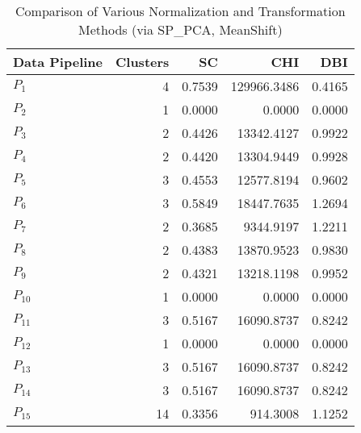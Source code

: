 \begin{table}[t]
\centering
\caption{Comparison of Various Normalization and Transformation Methods (via SP_PCA, MeanShift)}
\label{tbl:Comparison_SP_PCA_MeanShift_norm_tran}
\begin{tabular}{lrrrr}
\toprule
Data Pipeline &  Clusters &     SC &         CHI &    DBI \\
\midrule
      $P_{1}$ &         4 & 0.7539 & 129966.3486 & 0.4165 \\
      $P_{2}$ &         1 & 0.0000 &      0.0000 & 0.0000 \\
      $P_{3}$ &         2 & 0.4426 &  13342.4127 & 0.9922 \\
      $P_{4}$ &         2 & 0.4420 &  13304.9449 & 0.9928 \\
      $P_{5}$ &         3 & 0.4553 &  12577.8194 & 0.9602 \\
      $P_{6}$ &         3 & 0.5849 &  18447.7635 & 1.2694 \\
      $P_{7}$ &         2 & 0.3685 &   9344.9197 & 1.2211 \\
      $P_{8}$ &         2 & 0.4383 &  13870.9523 & 0.9830 \\
      $P_{9}$ &         2 & 0.4321 &  13218.1198 & 0.9952 \\
     $P_{10}$ &         1 & 0.0000 &      0.0000 & 0.0000 \\
     $P_{11}$ &         3 & 0.5167 &  16090.8737 & 0.8242 \\
     $P_{12}$ &         1 & 0.0000 &      0.0000 & 0.0000 \\
     $P_{13}$ &         3 & 0.5167 &  16090.8737 & 0.8242 \\
     $P_{14}$ &         3 & 0.5167 &  16090.8737 & 0.8242 \\
     $P_{15}$ &        14 & 0.3356 &    914.3008 & 1.1252 \\
\bottomrule
\end{tabular}
\end{table}
